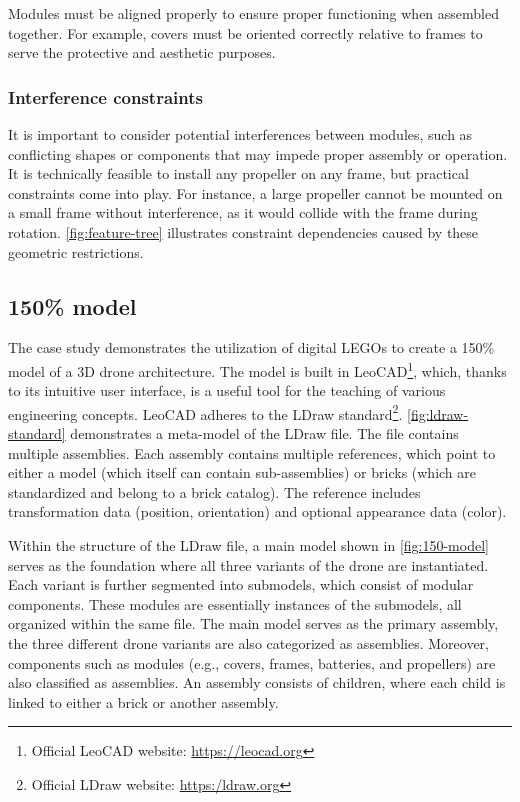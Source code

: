 \documentclass[sigconf,review]{acmart}
\begin{document}
Modules must be aligned properly to ensure proper functioning when assembled together. 
For example, covers must be oriented correctly relative to frames to serve the protective and aesthetic purposes. 

\subsubsection*{Interference constraints}

It is important to consider potential interferences between modules, such as conflicting shapes or components that may impede proper assembly or operation. 
It is technically feasible to install any propeller on any frame, but practical constraints come into play. 
For instance, a large propeller cannot be mounted on a small frame without interference, as it would collide with the frame during rotation.
\cref{fig:feature-tree} illustrates constraint dependencies caused by these geometric restrictions.

\subsection{150\% model}
\label{sec:150-model}

The case study demonstrates the utilization of digital LEGOs to create a 150\% model of a 3D drone architecture. 
The model is built in LeoCAD\footnote{Official LeoCAD website: \url{https://leocad.org}}, which, thanks to its intuitive user interface, is a useful tool for the teaching of various engineering concepts. 
LeoCAD adheres to the LDraw standard\footnote{Official LDraw website: \url{https:/ldraw.org}}. 
\cref{fig:ldraw-standard} demonstrates a meta-model of the LDraw file. The file contains multiple assemblies. 
Each assembly contains multiple references, which point to either a model (which itself can contain sub-assemblies) or bricks (which are standardized and belong to a brick catalog). 
The reference includes transformation data (position, orientation) and optional appearance data (color).

Within the structure of the LDraw file, a main model shown in \cref{fig:150-model} serves as the foundation where all three variants of the drone are instantiated. 
Each variant is further segmented into submodels, which consist of modular components. 
These modules are essentially instances of the submodels, all organized within the same file.
The main model serves as the primary assembly, the three different drone variants are also categorized as assemblies. 
Moreover, components such as modules (e.g., covers, frames, batteries, and propellers) are also classified as assemblies. 
An assembly consists of children, where each child is linked to either a brick or another assembly. 
\end{document}
